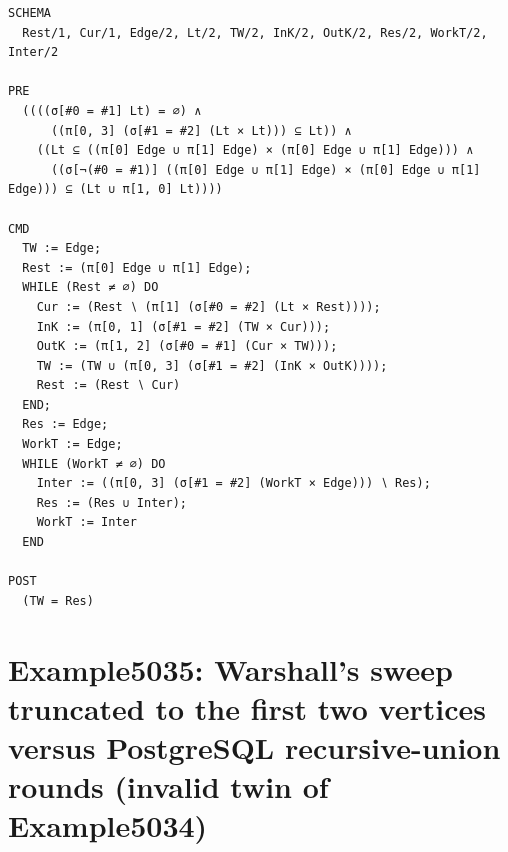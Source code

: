\documentclass[10pt]{article}
\begin{document}
\begin{Verbatim}[fontsize=\scriptsize,breaklines=true,breakanywhere=true,frame=single,framesep=1.5mm]
SCHEMA
  Rest/1, Cur/1, Edge/2, Lt/2, TW/2, InK/2, OutK/2, Res/2, WorkT/2, Inter/2

PRE
  ((((σ[#0 = #1] Lt) = ∅) ∧
      ((π[0, 3] (σ[#1 = #2] (Lt × Lt))) ⊆ Lt)) ∧
    ((Lt ⊆ ((π[0] Edge ∪ π[1] Edge) × (π[0] Edge ∪ π[1] Edge))) ∧
      ((σ[¬(#0 = #1)] ((π[0] Edge ∪ π[1] Edge) × (π[0] Edge ∪ π[1] Edge))) ⊆ (Lt ∪ π[1, 0] Lt))))

CMD
  TW := Edge;
  Rest := (π[0] Edge ∪ π[1] Edge);
  WHILE (Rest ≠ ∅) DO
    Cur := (Rest ∖ (π[1] (σ[#0 = #2] (Lt × Rest))));
    InK := (π[0, 1] (σ[#1 = #2] (TW × Cur)));
    OutK := (π[1, 2] (σ[#0 = #1] (Cur × TW)));
    TW := (TW ∪ (π[0, 3] (σ[#1 = #2] (InK × OutK))));
    Rest := (Rest ∖ Cur)
  END;
  Res := Edge;
  WorkT := Edge;
  WHILE (WorkT ≠ ∅) DO
    Inter := ((π[0, 3] (σ[#1 = #2] (WorkT × Edge))) ∖ Res);
    Res := (Res ∪ Inter);
    WorkT := Inter
  END

POST
  (TW = Res)
\end{Verbatim}

\Needspace{0.45\textheight}

\section{Example5035: Warshall's sweep truncated to the first two vertices versus PostgreSQL recursive-union rounds (invalid twin of Example5034)}\label{case:Example5035}
\end{document}
